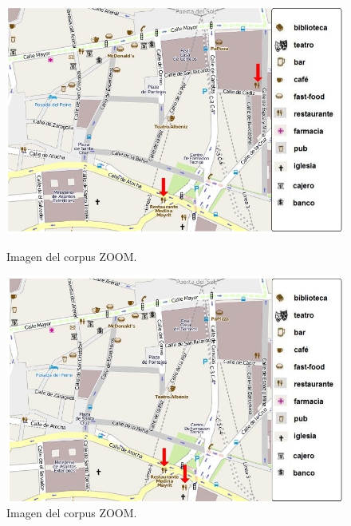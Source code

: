 \begin{figure}
\begin{minipage}[b]{0.5\linewidth}
\centering
\includegraphics[width=\textwidth]{images/corpus/mapa9.png}
\caption{Imagen del corpus ZOOM.}
\label{mapa9}
\end{minipage}
\hspace*{0cm}
\begin{minipage}[b]{0.5\linewidth}
\centering
\includegraphics[width=\textwidth]{images/corpus/mapa10.png}
\caption{Imagen del corpus ZOOM.}
\label{mapa10}
\end{minipage}
\end{figure}

